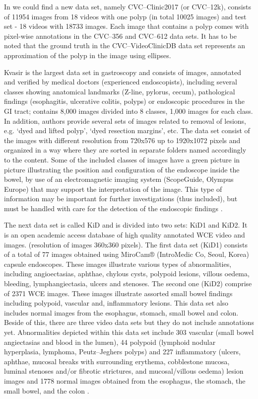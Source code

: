 \documentclass[preprint]{article}
\begin{document}
In \cite{cvc3} we could find a new data set, namely CVC--Clinic2017 (or CVC--12k), consists of 11954 images  from 18 videos with one polyp (in total 10025 images) and test set - 18 videos with 18733 images. Each image that contains a polyp comes with pixel-wise annotations in the CVC--356 and CVC--612 data sets. It has to be noted that the ground truth in the CVC--VideoClinicDB data set represents an approximation  of the polyp in the image using ellipses. 

Kvasir is the largest data set in gastroscopy and consists of images, annotated and verified by medical doctors (experienced endoscopists), including several classes showing anatomical landmarks (Z-line, pylorus, cecum), pathological findings (esophagitis, ulcerative colitis, polyps) or endoscopic procedures in the GI tract; contains 8,000 images divided into 8 classes, 1,000 images for each class. In addition, authors provide several sets of images related to removal of lesions, e.g. `dyed and lifted polyp', `dyed resection margins', etc. The data set consist of the images with different resolution from 720x576 up to 1920x1072 pixels and organized in a way where they are sorted in separate folders named accordingly to the content. Some of the included classes of images have a green picture in picture illustrating the position and configuration of the endoscope inside the bowel, by use of an electromagnetic imaging system (ScopeGuide, Olympus Europe) that may support the interpretation of the image. This type of information may be important for further investigations (thus included), but must be handled with care for the detection of the endoscopic findings \cite{kvasir}. 

The next data set is called KiD and is divided into two sets: KiD1 and KiD2. It is an open academic access database of high quality annotated WCE video and images. (resolution of images 360x360 pixels). The first data set (KiD1) consists of a total of 77 images obtained using MiroCam® (IntroMedic Co, Seoul, Korea) capsule endoscopes. These images illustrate various types of abnormalities, including angioectasias, aphthae, chylous cysts, polypoid lesions, villous oedema, bleeding, lymphangiectasia, ulcers and stenoses. The second one (KiD2) comprise of 2371 WCE images. These images illustrate assorted small bowel findings including polypoid, vascular and, inflammatory lesions. This data set also includes normal images from the esophagus, stomach, small bowel and colon. Beside of this, there are three video data sets but they do not include annotations yet. Abnormalities depicted within this data set include 303 vascular (small bowel angiectasias and blood in the lumen), 44 polypoid (lymphoid nodular hyperplasia, lymphoma, Peutz–Jeghers polyps) and 227 inflammatory (ulcers, aphthae, mucosal breaks with surrounding erythema, cobblestone mucosa, luminal stenoses and/or fibrotic strictures, and mucosal/villous oedema) lesion images and 1778 normal images obtained from the esophagus, the stomach, the small bowel, and the colon \cite{kid}.
\end{document}
